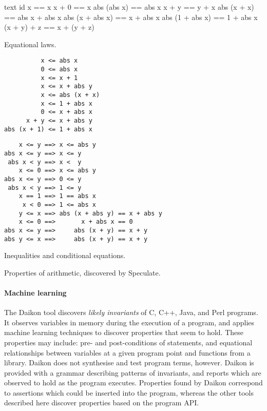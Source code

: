 \begin{listing}
\begin{sublisting}{\textwidth}
\centering
\begin{cminted}{text}
           id x == x
          x + 0 == x
    abs (abs x) == abs x
          x + y == y + x
    abs (x + x) == abs x + abs x
abs (x + abs x) == x + abs x
abs (1 + abs x) == 1 + abs x
    (x + y) + z == x + (y + z)
\end{cminted}
\caption{Equational laws.}\label{lst:arith_props0}
\end{sublisting}

\vspace{2.5em}

\begin{sublisting}{\textwidth}
\begin{minipage}[t]{0.45\textwidth}
\begin{verbatim}
          x <= abs x
          0 <= abs x
          x <= x + 1
          x <= x + abs y
          x <= abs (x + x)
          x <= 1 + abs x
          0 <= x + abs x
      x + y <= x + abs y
abs (x + 1) <= 1 + abs x
\end{verbatim}
\end{minipage}
\begin{minipage}[t]{0.55\textwidth}
\begin{verbatim}
    x <= y ==> x <= abs y
abs x <= y ==> x <= y
 abs x < y ==> x <  y
    x <= 0 ==> x <= abs y
abs x <= y ==> 0 <= y
 abs x < y ==> 1 <= y
    x == 1 ==> 1 == abs x
     x < 0 ==> 1 <= abs x
    y <= x ==> abs (x + abs y) == x + abs y
    x <= 0 ==>       x + abs x == 0
abs x <= y ==>     abs (x + y) == x + y
abs y <= x ==>     abs (x + y) == x + y
\end{verbatim}
\end{minipage}
\caption{Inequalities and conditional equations.}\label{lst:arith_props1}
\end{sublisting}
\caption{Properties of arithmetic, discovered by Speculate.}\label{lst:arith_props}
\end{listing}

\paragraph{Machine learning}
The Daikon\cite{ernst2007} tool discovers \emph{likely invariants} of
C, C++, Java, and Perl programs.  It observes variables in memory
during the execution of a program, and applies machine learning
techniques to discover properties that seem to hold.  These properties
may include: pre- and post-conditions of statements, and equational
relationships between variables at a given program point and functions
from a library.  Daikon does not synthesise and test program terms,
however.  Daikon is provided with a grammar describing patterns of
invariants, and reports which are observed to hold as the program
executes.  Properties found by Daikon correspond to assertions which
could be inserted into the program, whereas the other tools described
here discover properties based on the program API.

